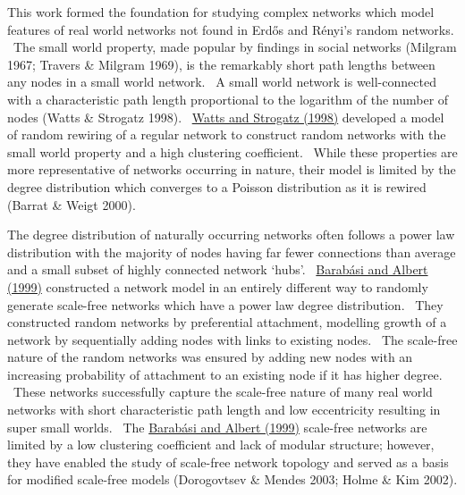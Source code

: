 This work formed the foundation for studying complex networks which
model features of real world networks not found in Erd\H{o}s and
R\'enyi{\textquoteright}s random networks. \ The small world property,
made popular by findings in social networks (Milgram 1967; Travers \&
Milgram 1969), is the remarkably short path lengths between any nodes
in a small world network. \ A small world network is well-connected
with a characteristic path length proportional to the logarithm of the
number of nodes (Watts \& Strogatz 1998). \ \hyperlink{ENREF112}{Watts
and Strogatz (1998)} developed a model of random rewiring of a regular
network to construct random networks with the small world property and
a high clustering coefficient. \ While these properties are more
representative of networks occurring in nature, their model is limited
by the degree distribution which converges to a Poisson distribution as
it is rewired (Barrat \& Weigt 2000). \ 


The degree distribution of naturally occurring networks often follows a
power law distribution with the majority of nodes having far fewer
connections than average and a small subset of highly connected network
{\textquoteleft}hubs{\textquoteright}. \ \hyperlink{ENREF7}{Barab\'asi
and Albert (1999)} constructed a network model in an entirely different
way to randomly generate scale-free networks which have a power law
degree distribution. \ They constructed random networks by preferential
attachment, modelling growth of a network by sequentially adding nodes
with links to existing nodes. \ The scale-free nature of the random
networks was ensured by adding new nodes with an increasing probability
of attachment to an existing node if it has higher degree. \ These
networks successfully capture the scale-free nature of many real world
networks with short characteristic path length and low eccentricity
resulting in super small worlds. \ The \hyperlink{ENREF7}{Barab\'asi
and Albert (1999)} scale-free networks are limited by a low clustering
coefficient and lack of modular structure; however, they have enabled
the study of scale-free network topology and served as a basis for
modified scale-free models (Dorogovtsev \& Mendes 2003; Holme \& Kim
2002). \ 


